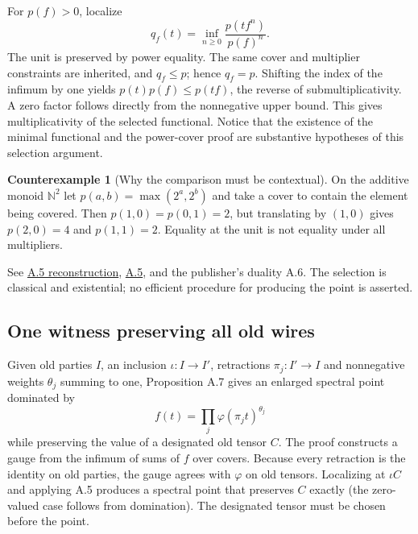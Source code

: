 \documentclass[11pt,letterpaper]{article}
\theoremstyle{definition}\newtheorem{definition}[theorem]{Definition}\newtheorem{example}[theorem]{Example}
\newtheorem{counterexample}[theorem]{Counterexample}
\theoremstyle{remark}\newtheorem{remark}[theorem]{Remark}
\newcommand{\N}{\mathbb{N}}
\newcommand{\pub}[3]{\href{https://github.com/anthropics/formal-math/blob/11b6c7e3c927df2658f513b6b68ea7f8929c62c5/vp-vnp/#1\#L#2}{#3}}
\newcommand{\aud}[2]{\href{https://github.com/nousentllc/VP-VNP-Review/blob/567303d0bcf4f9d54390437b137752446e58ccd6/#1}{#2}}
\begin{document}
For $p(f)>0$, localize
\[
 q_f(t)=\inf_{n\ge0}\frac{p(tf^n)}{p(f)^n}.
\]
The unit is preserved by power equality. The same cover and multiplier constraints are inherited, and $q_f\le p$; hence $q_f=p$. Shifting the index of the infimum by one yields $p(t)p(f)\le p(tf)$, the reverse of submultiplicativity. A zero factor follows directly from the nonnegative upper bound. This gives multiplicativity of the selected functional. Notice that the existence of the minimal functional and the power-cover proof are substantive hypotheses of this selection argument.
\begin{counterexample}[Why the comparison must be contextual]
On the additive monoid $\N^2$ let $p(a,b)=\max(2^a,2^b)$ and take a cover to contain the element being covered. Then $p(1,0)=p(0,1)=2$, but translating by $(1,0)$ gives $p(2,0)=4$ and $p(1,1)=2$. Equality at the unit is not equality under all multipliers.
\end{counterexample}
See \aud{passes/11b-spectral-selection.md}{A.5 reconstruction}, \pub{Paper/Gauges.lean}{392}{A.5}, and the publisher's duality A.6. The selection is classical and existential; no efficient procedure for producing the point is asserted.

\subsection{One witness preserving all old wires}\label{sec:extension}
Given old parties $I$, an inclusion $\iota:I\to I'$, retractions $\pi_j:I'\to I$ and nonnegative weights $\theta_j$ summing to one, Proposition A.7 gives an enlarged spectral point dominated by
\[
 f(t)=\prod_j\varphi(\pi_j t)^{\theta_j}
\]
while preserving the value of a designated old tensor $C$. The proof constructs a gauge from the infimum of sums of $f$ over covers. Because every retraction is the identity on old parties, the gauge agrees with $\varphi$ on old tensors. Localizing at $\iota C$ and applying A.5 produces a spectral point that preserves $C$ exactly (the zero-valued case follows from domination). The designated tensor must be chosen before the point.
\end{document}
